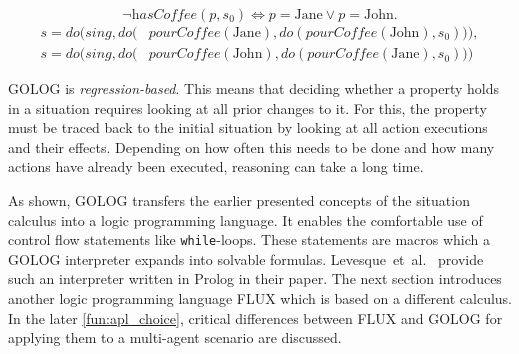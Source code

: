 \begin{equation}\label{ex_gologConfiguration}
  \neg\textit{hasCoffee}(p,s_0) \Leftrightarrow p=\textrm{Jane} \vee p=\textrm{John}.
\end{equation}
\begin{equation}\label{ex_situations}
  \begin{split}
    s=\textit{do}\Big(\textit{sing},\textit{do}\big(&\textit{pourCoffee}(\textrm{Jane}),
      \textit{do}(\textit{pourCoffee}(\textrm{John}),s_0)\big)\Big),
\\  s=\textit{do}\Big(\textit{sing},\textit{do}\big(&\textit{pourCoffee}(\textrm{John}),
      \textit{do}(\textit{pourCoffee}(\textrm{Jane}),s_0)\big)\Big)
  \end{split}
\end{equation}

GOLOG is \emph{regression-based}.
This means that deciding whether a property holds in a situation requires looking at all prior changes to it.
For this, the property must be traced back to the initial situation by looking at all action executions and their effects.
Depending on how often this needs to be done and how many actions have already been executed, reasoning can take a long time.

As shown, GOLOG transfers the earlier presented concepts of the situation calculus into a logic programming language.
It enables the comfortable use of control flow statements like \texttt{while}-loops.
These statements are macros which a GOLOG interpreter expands into solvable formulas.
Levesque~et~al.~\cite{levesque_golog:_1997} provide such an interpreter written in Prolog in their paper.
The next section introduces another logic programming language FLUX which is based on a different calculus.
In the later \autoref{fun:apl_choice}, critical differences between FLUX and GOLOG for applying them to a multi-agent scenario are discussed.
